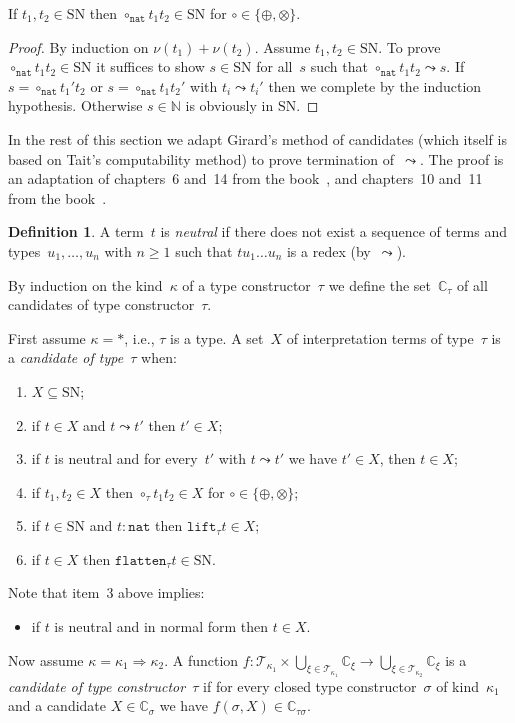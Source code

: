 \documentclass[a4paper,UKenglish,cleveref,autoref,numberwithinsect]{lipics-v2019}
\theoremstyle{definition}
\newtheorem{defn}[theorem]{Definition}
\newcommand{\arrkind}{\Rightarrow}
\newcommand{\arrW}{\leadsto}
\newcommand{\nat}{\mathtt{nat}}
\newcommand{\flatten}{\mathtt{flatten}}
\newcommand{\lift}{\mathtt{lift}}
\newcommand{\Tc}{\mathcal{T}}
\newcommand{\SN}{\mathrm{SN}}
\newcommand{\Cb}{\mathbb{C}}
\begin{document}
\begin{lemma}\label{lem_circ_sn_base}
  If $t_1,t_2 \in \SN$ then $\circ_\nat t_1 t_2 \in \SN$ for $\circ
  \in \{\oplus,\otimes\}$.
\end{lemma}

\begin{proof}
  By induction on $\nu(t_1) + \nu(t_2)$. Assume $t_1,t_2 \in \SN$. To
  prove $\circ_\nat t_1 t_2 \in \SN$ it suffices to show $s \in \SN$
  for all~$s$ such that $\circ_\nat t_1 t_2 \arrW s$. If $s =
  \circ_\nat t_1' t_2$ or $s = \circ_\nat t_1 t_2'$ with $t_i \arrW
  t_i'$ then we complete by the induction hypothesis. Otherwise $s \in
  \mathbb{N}$ is obviously in $\SN$.
\end{proof}

In the rest of this section we adapt Girard's method of candidates
(which itself is based on Tait's computability method) to prove
termination of~$\arrW$. The proof is an adaptation of chapters~6
and~14 from the book~\cite{Girard1989}, and chapters~10 and~11 from
the book~\cite{SorensenUrzyczyn2006}.

\begin{defn}\label{def_candidate}
  A term~$t$ is \emph{neutral} if there does not exist a sequence of
  terms and types~$u_1,\ldots,u_n$ with $n \ge 1$ such that $t u_1
  \ldots u_n$ is a redex (by~$\arrW$).

  By induction on the kind~$\kappa$ of a type constructor~$\tau$ we
  define the set~$\Cb_\tau$ of all candidates of type
  constructor~$\tau$.

  First assume $\kappa=*$, i.e., $\tau$ is a type. A set~$X$ of
  interpretation terms of type~$\tau$ is a \emph{candidate of
    type~$\tau$} when:
  \begin{enumerate}
  \item $X \subseteq \SN$;
  \item if $t \in X$ and $t \arrW t'$ then $t' \in X$;
  \item if $t$ is neutral and for every~$t'$ with $t \arrW t'$ we
    have $t' \in X$, then $t \in X$;
  \item if $t_1,t_2 \in X$ then $\circ_\tau t_1 t_2 \in X$ for
    $\circ \in \{\oplus,\otimes\}$;
  \item if $t \in \SN$ and $t : \nat$ then $\lift_\tau t \in X$;
  \item if $t \in X$ then $\flatten_\tau t \in \SN$.
  \end{enumerate}
  Note that item~3 above implies:
  \begin{itemize}
  \item if $t$ is neutral and in normal form then $t \in X$.
  \end{itemize}

  Now assume $\kappa = \kappa_1\arrkind\kappa_2$. A function $f :
  \Tc_{\kappa_1} \times \bigcup_{\xi\in\Tc_{\kappa_1}}\Cb_\xi \to
  \bigcup_{\xi\in\Tc_{\kappa_2}}\Cb_\xi$ is a \emph{candidate of type
    constructor~$\tau$} if for every closed type constructor~$\sigma$
  of kind~$\kappa_1$ and a candidate $X \in \Cb_\sigma$ we have
  $f(\sigma,X) \in \Cb_{\tau\sigma}$.
\end{defn}
\end{document}
